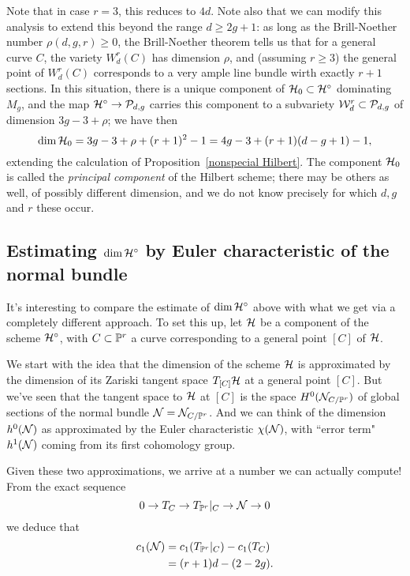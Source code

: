 Note that in case $r=3$, this reduces to $4d$. Note also that we can modify this analysis to extend this beyond the range $d \geq 2g+1$: as long as the Brill-Noether number $\rho(d,g,r) \geq 0$, the Brill-Noether theorem tells us that for a general curve $C$, the variety $W^r_d(C)$ has dimension $\rho$, and (assuming $r \geq 3$) the general point of $W^r_d(C)$ corresponds to a very ample line bundle wirth exactly $r+1$ sections. In this situation, there is a unique component of $\cH_0 \subset \cH^\circ$ dominating $M_g$, and the map $\cH^\circ \to \cP_{d,g}$ carries this component to a subvariety $\cW^r_d \subset \cP_{d,g}$ of dimension $3g-3 + \rho$; we have then
$$
\dim \cH_0 = 3g-3+\rho + (r+1)^2 - 1 = 4g-3 + (r+1)(d-g+1) - 1,
$$
extending the calculation of Proposition~\ref{nonspecial Hilbert}. The component $\cH_0$ is called the \emph{principal component} of the Hilbert scheme; there may be others as well, of possibly different dimension, and we do not know precisely for which $d,g$ and $r$ these occur.

\subsection{Estimating $\dim \cH^\circ$ by Euler characteristic of the normal bundle}

It's interesting to compare the estimate of  $\dim \cH^\circ$ above with what we get via a completely different approach. To set this up, let $\cH$ be a component of the scheme $\cH^\circ$, with $C \subset \PP^r$ a curve corresponding to a general point $[C]$ of $\cH$.

We start with the idea that the dimension of the scheme $\cH$ is approximated by the dimension of its Zariski tangent space $T_{[C]}\cH$ at a general point $[C]$. But we've seen that the tangent space to $\cH$ at $[C]$ is the space $H^0(\cN_{C/\PP^r})$ of global sections of the normal bundle $\cN = \cN_{C/\PP^r}$. And we can think of the dimension $h^0(\cN)$ as approximated by the Euler characteristic $\chi(\cN)$, with ``error term" $h^1(\cN)$ coming from its first cohomology group.

Given these two approximations, we arrive at a number we can actually compute! From the exact sequence
$$
0 \to T_C \to T_{\PP^r}|_C \to \cN \to 0
$$
we deduce that
\begin{align*}
c_1(\cN) &= c_1(T_{\PP^r}|_C) - c_1(T_C) \\
&= (r+1)d - (2-2g).
\end{align*}

